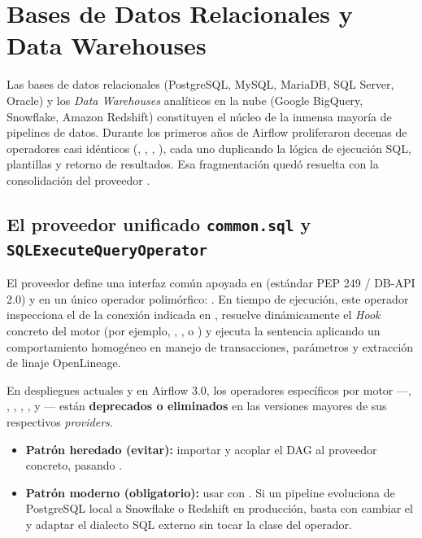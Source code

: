 \section{Bases de Datos Relacionales y Data Warehouses}\label{sec:conectores-sql}

Las bases de datos relacionales (PostgreSQL, MySQL, MariaDB, SQL Server, Oracle) y los \textit{Data Warehouses} analíticos en la nube (Google BigQuery, Snowflake, Amazon Redshift) constituyen el núcleo de la inmensa mayoría de pipelines de datos. Durante los primeros años de Airflow proliferaron decenas de operadores casi idénticos (, , , ), cada uno duplicando la lógica de ejecución SQL, plantillas y retorno de resultados. Esa fragmentación quedó resuelta con la consolidación del proveedor .

\subsection{El proveedor unificado \texttt{common.sql} y \texttt{SQLExecuteQueryOperator}}

El proveedor  define una interfaz común apoyada en  (estándar PEP 249 / DB-API 2.0) y en un único operador polimórfico: . En tiempo de ejecución, este operador inspecciona el  de la conexión indicada en , resuelve dinámicamente el \textit{Hook} concreto del motor (por ejemplo, , ,  o ) y ejecuta la sentencia aplicando un comportamiento homogéneo en manejo de transacciones, parámetros y extracción de linaje OpenLineage.

\begin{modernbox}
En despliegues actuales y en Airflow 3.0, los operadores específicos por motor ---, , , , ,  y --- están \textbf{deprecados o eliminados} en las versiones mayores de sus respectivos \textit{providers}.
\begin{itemize}
  \item \textbf{Patrón heredado (evitar):} importar  y acoplar el DAG al proveedor concreto, pasando .
  \item \textbf{Patrón moderno (obligatorio):} usar  con . Si un pipeline evoluciona de PostgreSQL local a Snowflake o Redshift en producción, basta con cambiar el  y adaptar el dialecto SQL externo sin tocar la clase del operador.
\end{itemize}
\end{modernbox}

